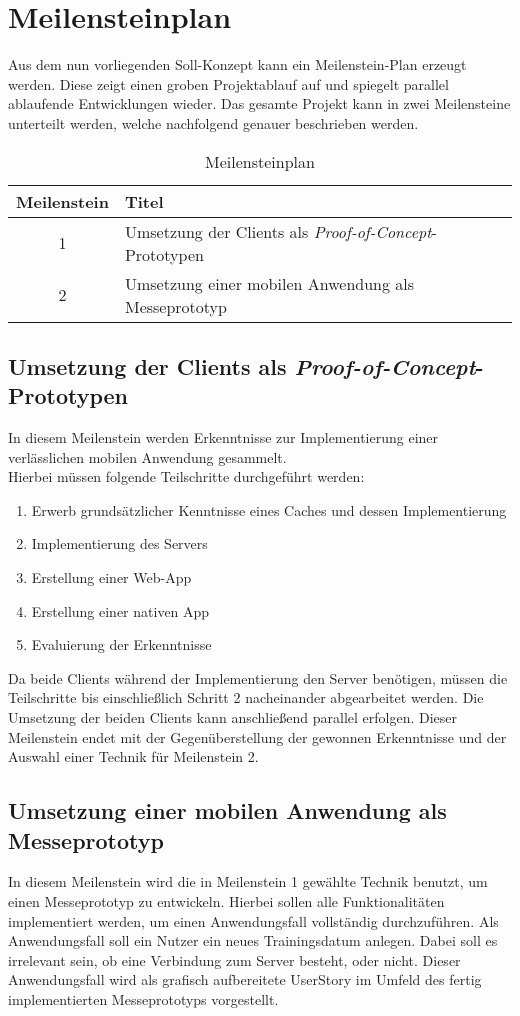\section{Meilensteinplan}
\label{sec:meilenstein-plan}
Aus dem nun vorliegenden Soll-Konzept kann ein Meilenstein-Plan erzeugt werden. Diese zeigt einen groben Projektablauf auf und spiegelt parallel ablaufende Entwicklungen wieder. Das gesamte Projekt kann in zwei Meilensteine unterteilt werden, welche nachfolgend genauer beschrieben werden.
\begin{table}[!h]
\centering
\caption{Meilensteinplan}
\label{tbl:meilensteinplan}
\begin{tabular}{|c|l|}
\hline
{\bf Meilenstein} & {\bf Titel}                                                      \\ \hline
1                 & Umsetzung der Clients als \textit{Proof-of-Concept}-Prototypen \\ \hline
2                 & Umsetzung einer mobilen Anwendung als Messeprototyp              \\ \hline
\end{tabular}
\end{table}

\subsection{Umsetzung der Clients als \textit{Proof-of-Concept}-Prototypen}
In diesem Meilenstein werden Erkenntnisse zur Implementierung einer verlässlichen mobilen Anwendung gesammelt. \\
Hierbei müssen folgende Teilschritte durchgeführt werden:
\begin{enumerate}
\item Erwerb grundsätzlicher Kenntnisse eines Caches und dessen Implementierung
\item Implementierung des Servers 
\item Erstellung einer \ac{Web-App}
\item Erstellung einer nativen App
\item Evaluierung der Erkenntnisse
\end{enumerate}
Da beide Clients während der Implementierung den Server benötigen, müssen die Teilschritte bis einschließlich Schritt 2 nacheinander abgearbeitet werden. Die Umsetzung der beiden Clients kann anschließend parallel erfolgen. Dieser Meilenstein endet mit der Gegenüberstellung der gewonnen Erkenntnisse und der Auswahl einer Technik für Meilenstein 2.
\subsection{Umsetzung einer mobilen Anwendung als Messeprototyp}
In diesem Meilenstein wird die in Meilenstein 1 gewählte Technik benutzt, um einen Messeprototyp zu entwickeln. Hierbei sollen alle Funktionalitäten implementiert werden, um einen Anwendungsfall vollständig durchzuführen. Als Anwendungsfall soll ein Nutzer ein neues Trainingsdatum anlegen. Dabei soll es irrelevant sein, ob eine Verbindung zum Server besteht, oder nicht. Dieser Anwendungsfall wird als grafisch aufbereitete \gls{UserStory} im Umfeld des fertig implementierten Messeprototyps vorgestellt.